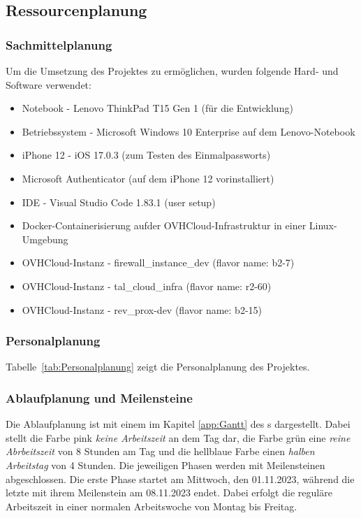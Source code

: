 \subsection{Ressourcenplanung}
\label{sec:Ressourcenplanung}

\subsubsection{Sachmittelplanung}
\label{sec:Sachmittelplanung}
Um die Umsetzung des Projektes zu ermöglichen, wurden folgende Hard- und Software verwendet:
\begin{itemize} [label=--]
	\item Notebook - Lenovo ThinkPad T15 Gen 1 (für die Entwicklung)
	\item Betriebssystem - Microsoft Windows 10 Enterprise auf dem Lenovo-Notebook
	\item iPhone 12 - iOS 17.0.3 (zum Testen des Einmalpassworts)
	\item Microsoft Authenticator (auf dem iPhone 12 vorinstalliert)
	\item \acs{IDE} - Visual Studio Code 1.83.1 (user setup)
	\item Docker-Containerisierung aufder OVHCloud-Infrastruktur in einer Linux-Umgebung
	\item OVHCloud-Instanz - firewall\_instance\_dev (flavor name: b2-7)
	\item OVHCloud-Instanz - tal\_cloud\_infra (flavor name: r2-60)
	\item OVHCloud-Instanz - rev\_prox-dev (flavor name: b2-15)
\end{itemize}

\subsubsection{Personalplanung}
\label{sec:Personalplanung}
Tabelle~\ref{tab:Personalplanung} zeigt die Personalplanung des Projektes.

\subsubsection{Ablaufplanung und Meilensteine}
\label{sec:Ablaufplaung und Meilensteine}
Die Ablaufplanung ist mit einem  im Kapitel \ref{app:Gantt} des s dargestellt. 
Dabei stellt die Farbe pink \textit{keine Arbeitszeit} an dem Tag dar, die Farbe grün eine \textit{reine Abrbeitszeit} 
von 8 Stunden am Tag und die hellblaue Farbe einen \textit{halben Arbeitstag} von 4 Stunden. Die jeweiligen Phasen 
werden mit Meilensteinen abgeschlossen. Die erste Phase startet am Mittwoch, den 01.11.2023, während die letzte 
mit ihrem Meilenstein am 08.11.2023 endet. Dabei erfolgt die reguläre Arbeitszeit in einer normalen Arbeitswoche 
von Montag bis Freitag.

